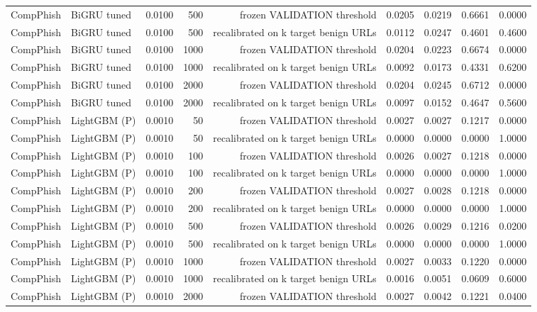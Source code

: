 \begin{table}[t]
\begin{tabular}{llrrrrrrr}
CompPhish & BiGRU tuned & 0.0100 & 500 & frozen VALIDATION threshold & 0.0205 & 0.0219 & 0.6661 & 0.0000 \\
CompPhish & BiGRU tuned & 0.0100 & 500 & recalibrated on k target benign URLs & 0.0112 & 0.0247 & 0.4601 & 0.4600 \\
CompPhish & BiGRU tuned & 0.0100 & 1000 & frozen VALIDATION threshold & 0.0204 & 0.0223 & 0.6674 & 0.0000 \\
CompPhish & BiGRU tuned & 0.0100 & 1000 & recalibrated on k target benign URLs & 0.0092 & 0.0173 & 0.4331 & 0.6200 \\
CompPhish & BiGRU tuned & 0.0100 & 2000 & frozen VALIDATION threshold & 0.0204 & 0.0245 & 0.6712 & 0.0000 \\
CompPhish & BiGRU tuned & 0.0100 & 2000 & recalibrated on k target benign URLs & 0.0097 & 0.0152 & 0.4647 & 0.5600 \\
CompPhish & LightGBM (P) & 0.0010 & 50 & frozen VALIDATION threshold & 0.0027 & 0.0027 & 0.1217 & 0.0000 \\
CompPhish & LightGBM (P) & 0.0010 & 50 & recalibrated on k target benign URLs & 0.0000 & 0.0000 & 0.0000 & 1.0000 \\
CompPhish & LightGBM (P) & 0.0010 & 100 & frozen VALIDATION threshold & 0.0026 & 0.0027 & 0.1218 & 0.0000 \\
CompPhish & LightGBM (P) & 0.0010 & 100 & recalibrated on k target benign URLs & 0.0000 & 0.0000 & 0.0000 & 1.0000 \\
CompPhish & LightGBM (P) & 0.0010 & 200 & frozen VALIDATION threshold & 0.0027 & 0.0028 & 0.1218 & 0.0000 \\
CompPhish & LightGBM (P) & 0.0010 & 200 & recalibrated on k target benign URLs & 0.0000 & 0.0000 & 0.0000 & 1.0000 \\
CompPhish & LightGBM (P) & 0.0010 & 500 & frozen VALIDATION threshold & 0.0026 & 0.0029 & 0.1216 & 0.0200 \\
CompPhish & LightGBM (P) & 0.0010 & 500 & recalibrated on k target benign URLs & 0.0000 & 0.0000 & 0.0000 & 1.0000 \\
CompPhish & LightGBM (P) & 0.0010 & 1000 & frozen VALIDATION threshold & 0.0027 & 0.0033 & 0.1220 & 0.0000 \\
CompPhish & LightGBM (P) & 0.0010 & 1000 & recalibrated on k target benign URLs & 0.0016 & 0.0051 & 0.0609 & 0.6000 \\
CompPhish & LightGBM (P) & 0.0010 & 2000 & frozen VALIDATION threshold & 0.0027 & 0.0042 & 0.1221 & 0.0400 \\

\end{tabular}
\end{table}
